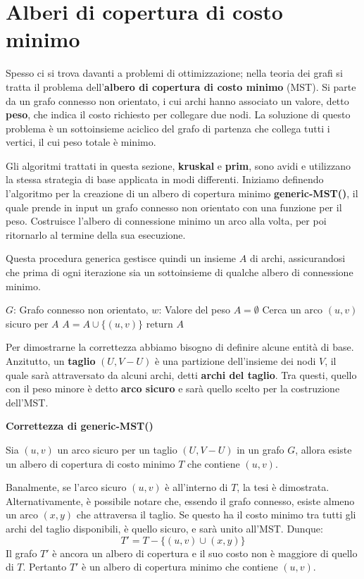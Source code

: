 \section{Alberi di copertura di costo minimo}
Spesso ci si trova davanti a problemi di ottimizzazione; nella teoria dei grafi si tratta il problema dell'\textbf{albero di copertura di costo minimo} (MST). Si parte da un grafo connesso non orientato, i cui archi hanno associato un valore, detto \textbf{peso}, che indica il costo richiesto per collegare due nodi. La soluzione di questo problema è un sottoinsieme aciclico del grafo di partenza che collega tutti i vertici, il cui peso totale è minimo.\par
Gli algoritmi trattati in questa sezione, \textbf{kruskal} e \textbf{prim}, sono avidi e utilizzano la stessa strategia di base applicata in modi differenti. Iniziamo definendo l'algoritmo per la creazione di un albero di copertura minimo \textbf{generic-MST()}, il quale prende in input un grafo connesso non orientato con una funzione per il peso. Costruisce l'albero di connessione minimo un arco alla volta, per poi ritornarlo al termine della sua esecuzione.\par
Questa procedura generica gestisce quindi un insieme $A$ di archi, assicurandosi che prima di ogni iterazione sia un sottoinsieme di qualche albero di connessione minimo.
\begin{algorithm}[h]
	\caption{generic-MST(G, w)}
	\begin{algorithmic}[i]
		\Require $G$: Grafo connesso non orientato, $w$: Valore del peso
		\State $A = \emptyset$
		\State Cerca un arco $(u,v)$ sicuro per $A$
		\State $A = A\cup \{(u,v)\}$
		\EndWhile
		\State return $A$
	\end{algorithmic}
\end{algorithm}
\noindent Per dimostrarne la correttezza abbiamo bisogno di definire alcune entità di base. Anzitutto, un \textbf{taglio} $(U, V-U)$ è una partizione dell'insieme dei nodi $V$, il quale sarà attraversato da alcuni archi, detti \textbf{archi del taglio}. Tra questi, quello con il peso minore è detto \textbf{arco sicuro} e sarà quello scelto per la costruzione dell'MST.
\begin{teorema}
	\textbf{Correttezza di generic-MST()}\par
	\noindent Sia $(u,v)$ un arco sicuro per un taglio $(U, V-U)$ in un grafo $G$, allora esiste un albero di copertura di costo minimo $T$ che contiene $(u,v)$.
\end{teorema}
\noindent Banalmente, se l'arco sicuro $(u,v)$ è all'interno di $T$, la tesi è dimostrata. Alternativamente, è possibile notare che, essendo il grafo connesso, esiste almeno un arco $(x,y)$ che attraversa il taglio. Se questo ha il costo minimo tra tutti gli archi del taglio disponibili, è quello sicuro, e sarà unito all'MST. Dunque: \[T' = T - \{(u,v) \cup (x,y)\}\]
\noindent Il grafo $T'$ è ancora un albero di copertura e il suo costo non è maggiore di quello di $T$. Pertanto $T'$ è un albero di copertura minimo che contiene $(u,v)$.\newline

